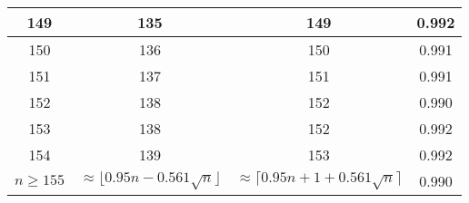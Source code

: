 \begin{table}
\begin{tabular}{|c|c|c|c|}
 149  & 135  & 149 & 0.992  \\ \hline
 150  & 136  & 150 & 0.991  \\ \hline
 151  & 137  & 151 & 0.991  \\ \hline
 152  & 138  & 152 & 0.990  \\ \hline
 153  & 138  & 152 & 0.992  \\ \hline
 154  & 139  & 153 & 0.992  \\ \hline
\hline $n \geq 155$ &
\multicolumn{1}{p{15mm}|}{$\approx \lfloor 0.95 n - 0.561 \sqrt{n}\rfloor$} &
\multicolumn{1}{p{15mm}|}{$\approx \lceil 0.95 n + 1 + 0.561 \sqrt{n}\rceil$} &
0.990 \\ \hline
\end{tabular}
 \hspace{2mm}
\end{table}
